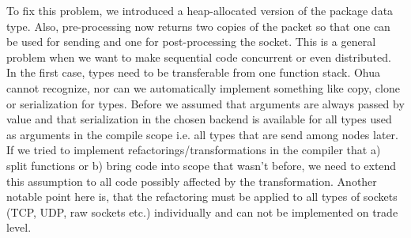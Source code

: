 To fix this problem, we introduced a heap-allocated version of the package data type. Also, pre-processing now returns two copies of the packet so that one can be used for sending and one for post-processing the socket. This is a general problem when we want to make sequential code concurrent or even distributed. In the first case, types need to be transferable from one function stack. Ohua cannot recognize, nor can we automatically implement something like copy, clone or serialization for types. Before we assumed that arguments are always passed by value and that serialization in the chosen backend is available for all types used as arguments in the compile scope i.e. all types that are send among nodes later. If we tried to implement refactorings/transformations in the compiler that a) split functions or b) bring code into scope that wasn't before, we need to extend this assumption to all code possibly affected by the transformation. Another notable point here is, that the refactoring must be applied to all types of sockets (TCP, UDP, raw sockets etc.) individually and can not be implemented on trade level.\\


